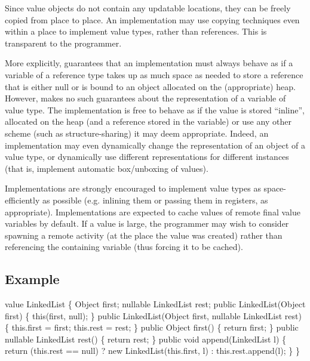 Since value objects do not contain any updatable locations, they can
be freely copied from place to place. An implementation may use
copying techniques even within a place to implement value types,
rather than references. This is transparent to the programmer.

More explicitly, \Xten{} guarantees that an implementation must always
behave as if a variable of a reference type takes up as much space as
needed to store a reference that is either null or is bound to an
object allocated on the (appropriate) heap. However, \Xten{} makes no
such guarantees about the representation of a variable of value
type. The implementation is free to behave as if the value is stored
``inline'', allocated on the heap (and a reference stored in the
variable) or use any other scheme (such as structure-sharing) it may
deem appropriate. Indeed, an implementation may even dynamically
change the representation of an object of a value type, or dynamically
use different representations for different instances (that is,
implement automatic box/unboxing of values).

Implementations are strongly encouraged to implement value types as
space-efficiently as possible (e.g.{} inlining them or passing them in
registers, as appropriate).  Implementations are expected to cache
values of remote final value variables by default. If a value is
large, the programmer may wish to consider spawning a remote activity
(at the place the value was created) rather than referencing the
containing variable (thus forcing it to be cached).


\subsection{Example}
\begin{x10}
value LinkedList  \{ 
  Object first;
  nullable LinkedList rest;
  public
     LinkedList(Object first) \{
     this(first, null);
  \}
  public
    LinkedList(Object first,  
               nullable LinkedList rest) \{
    this.first = first;
    this.rest = rest;
  \}
  public 
    Object first() \{
    return first;
  \}
  public 
    nullable LinkedList rest() \{
    return rest;
  \} 
  public
    void append(LinkedList l) \{
    return (this.rest == null) 
        ? new LinkedList(this.first, l) 
        : this.rest.append(l);
  \}
\}
\end{x10}

